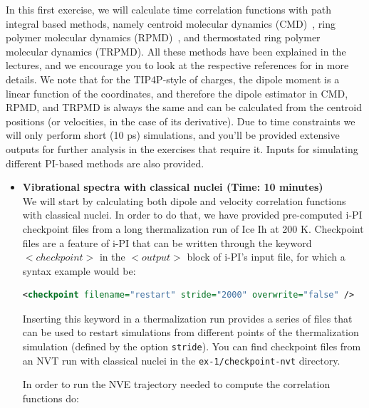 \documentclass{article}
\begin{document}
\begin{Exercise}[label={realtime},title={Velocity and dipole real time correlation functions}]

In this first exercise, we will calculate time correlation functions with path integral based methods, namely centroid molecular dynamics (CMD)~\cite{cao-voth94jcp}, ring polymer molecular dynamics (RPMD)~\cite{crai-mano04jcp}, and thermostated ring polymer molecular dynamics (TRPMD)\cite{ross+14jcp}. All these methods have been explained in the lectures, and we encourage you to look at the respective references for in more details. We note that for the TIP4P-style of charges, the dipole moment is a linear function of the coordinates, and therefore the dipole estimator in CMD, RPMD, and TRPMD is always the same and can be calculated from the centroid positions (or velocities, in the case of its derivative). Due to time constraints we will only perform short (10 ps) simulations, and you'll be provided extensive outputs for further analysis in the exercises that require it. Inputs for simulating different PI-based methods are also provided.

\begin{itemize}

\item \textbf{Vibrational spectra with classical nuclei (Time: 10 minutes)} \\
We will start by calculating both dipole and velocity correlation functions with classical nuclei. In order to do that, we have provided pre-computed i-PI checkpoint files from a long thermalization run of Ice Ih at 200 K. Checkpoint files are a feature of i-PI that can be written through the keyword \lstinxml$<checkpoint>$ in the \lstinxml$<output>$ block of i-PI's input file, for which a syntax example would be:
    
\begin{lstlisting}[language=XML]
<checkpoint filename="restart" stride="2000" overwrite="false" />
\end{lstlisting}

    Inserting this keyword in a thermalization run provides a series of files that can be used to restart simulations from different points of the thermalization simulation (defined by the option \texttt{stride}). You can find checkpoint files from an NVT run with classical nuclei in the \texttt{ex-1/checkpoint-nvt} directory. 
    
    In order to run the NVE trajectory needed to compute the correlation functions do:
    

\end{itemize}
\end{Exercise}
\end{document}
